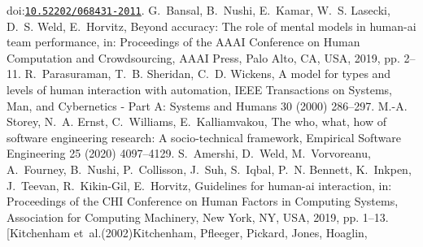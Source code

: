 \documentclass[10pt,a4paper]{article}
\providecommand{\bibinfo}[2]{#2}
\providecommand{\DOIprefix}{doi:}
\providecommand{\doi}[1]{\href{https://doi.org/#1}{\nolinkurl{#1}}}
\begin{document}
\begin{thebibliography}{24}
  \DOIprefix\doi{10.52202/068431-2011}.
\bibinfo{author}{G.~Bansal}, \bibinfo{author}{B.~Nushi},
  \bibinfo{author}{E.~Kamar}, \bibinfo{author}{W.~S. Lasecki},
  \bibinfo{author}{D.~S. Weld}, \bibinfo{author}{E.~Horvitz},
\newblock \bibinfo{title}{Beyond accuracy: The role of mental models in
  human-ai team performance},
\newblock in: \bibinfo{booktitle}{Proceedings of the AAAI Conference on Human
  Computation and Crowdsourcing}, \bibinfo{publisher}{AAAI Press},
  \bibinfo{address}{Palo Alto, CA, USA}, \bibinfo{year}{2019}, pp.
  \bibinfo{pages}{2--11}.
\bibinfo{author}{R.~Parasuraman}, \bibinfo{author}{T.~B. Sheridan},
  \bibinfo{author}{C.~D. Wickens},
\newblock \bibinfo{title}{A model for types and levels of human interaction
  with automation},
\newblock \bibinfo{journal}{IEEE Transactions on Systems, Man, and Cybernetics
  - Part A: Systems and Humans} \bibinfo{volume}{30} (\bibinfo{year}{2000})
  \bibinfo{pages}{286--297}.
\bibinfo{author}{M.-A. Storey}, \bibinfo{author}{N.~A. Ernst},
  \bibinfo{author}{C.~Williams}, \bibinfo{author}{E.~Kalliamvakou},
\newblock \bibinfo{title}{The who, what, how of software engineering research:
  A socio-technical framework},
\newblock \bibinfo{journal}{Empirical Software Engineering}
  \bibinfo{volume}{25} (\bibinfo{year}{2020}) \bibinfo{pages}{4097--4129}.
\bibinfo{author}{S.~Amershi}, \bibinfo{author}{D.~Weld},
  \bibinfo{author}{M.~Vorvoreanu}, \bibinfo{author}{A.~Fourney},
  \bibinfo{author}{B.~Nushi}, \bibinfo{author}{P.~Collisson},
  \bibinfo{author}{J.~Suh}, \bibinfo{author}{S.~Iqbal}, \bibinfo{author}{P.~N.
  Bennett}, \bibinfo{author}{K.~Inkpen}, \bibinfo{author}{J.~Teevan},
  \bibinfo{author}{R.~Kikin-Gil}, \bibinfo{author}{E.~Horvitz},
\newblock \bibinfo{title}{Guidelines for human-ai interaction},
\newblock in: \bibinfo{booktitle}{Proceedings of the CHI Conference on Human
  Factors in Computing Systems}, \bibinfo{publisher}{Association for Computing
  Machinery}, \bibinfo{address}{New York, NY, USA}, \bibinfo{year}{2019}, pp.
  \bibinfo{pages}{1--13}.
\bibitem[{Kitchenham et~al.(2002)Kitchenham, Pfleeger, Pickard, Jones, Hoaglin,
}
\end{thebibliography}
\end{document}
